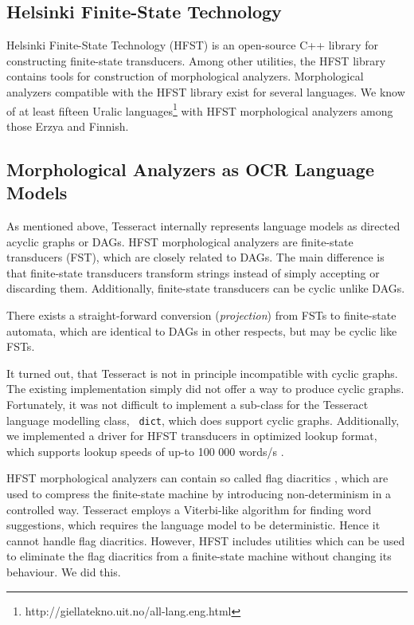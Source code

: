 \documentclass[b5paper]{article}
\begin{document}
\subsection{Helsinki Finite-State Technology}
Helsinki Finite-State Technology (HFST) \cite{linden13} is an
open-source C++ library for constructing finite-state
transducers. Among other utilities, the HFST library contains tools
for construction of morphological analyzers. Morphological analyzers
compatible with the HFST library exist for several languages. We know
of at least fifteen Uralic
languages\footnote{http://giellatekno.uit.no/all-lang.eng.html} with
HFST morphological analyzers among those Erzya and Finnish.

\subsection{Morphological Analyzers as OCR Language Models}
As mentioned above, Tesseract internally represents language models as
directed acyclic graphs or DAGs. HFST morphological analyzers are
finite-state transducers (FST), which are closely related to DAGs. The
main difference is that finite-state transducers transform strings
instead of simply accepting or discarding them. Additionally,
finite-state transducers can be cyclic unlike DAGs.

There exists a straight-forward conversion ({\it projection})
from FSTs to finite-state automata, which are identical to DAGs in
other respects, but may be cyclic like FSTs. 

It turned out, that Tesseract is not in principle incompatible with
cyclic graphs. The existing implementation simply did not offer a way
to produce cyclic graphs. Fortunately, it was not difficult to
implement a sub-class for the Tesseract language modelling class, {\tt
  dict}, which does support cyclic graphs. Additionally, we
implemented a driver for HFST transducers in optimized lookup format,
which supports lookup speeds of up-to 100 000 words/s
\cite{silfverberg09}.

HFST morphological analyzers can contain so called flag diacritics
\cite{beesley03}, which are used to compress the finite-state machine
by introducing non-determinism in a controlled way. Tesseract employs
a Viterbi-like algorithm for finding word suggestions, which requires
the language model to be deterministic. Hence it cannot handle flag
diacritics. However, HFST includes utilities which can be used to
eliminate the flag diacritics from a finite-state machine without
changing its behaviour. We did this.
\end{document}
